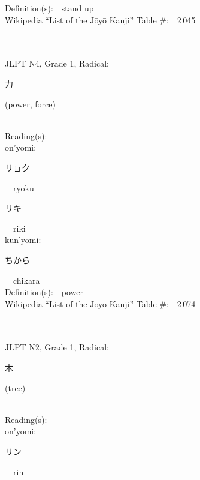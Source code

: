 \begin{multicols}{2}
Definition(s):\ \ stand up \\
Wikipedia ``List of the J\=oy\=o Kanji'' Table \#:\ \ 2\,045 \\
\ \ \\
{\fontsize{34pt}{40pt}  }\ \ \\  %
{JLPT N4, Grade 1, Radical:\ \ {\begin{CJK}{UTF8}{min} 力 \end{CJK}} (power, force) } \\
Reading(s):\ \ \\
{\hspace*{1em}}on'yomi:\ \ \\
{\hspace*{2em}}{\begin{CJK}{UTF8}{min} リョク \end{CJK}}\ \ ryoku\ \ \\
{\hspace*{2em}}{\begin{CJK}{UTF8}{min} リキ \end{CJK}}\ \ riki\ \ \\
{\hspace*{1em}}kun'yomi:\ \ \\
{\hspace*{2em}}{\begin{CJK}{UTF8}{min} ちから \end{CJK}}\ \ chikara\ \ \\
Definition(s):\ \ power \\
Wikipedia ``List of the J\=oy\=o Kanji'' Table \#:\ \ 2\,074 \\
\ \ \\
{\fontsize{34pt}{40pt}  }\ \ \\  %
{JLPT N2, Grade 1, Radical:\ \ {\begin{CJK}{UTF8}{min} 木 \end{CJK}} (tree) } \\
Reading(s):\ \ \\
{\hspace*{1em}}on'yomi:\ \ \\
{\hspace*{2em}}{\begin{CJK}{UTF8}{min} リン \end{CJK}}\ \ rin\ \ \\

\end{multicols}
